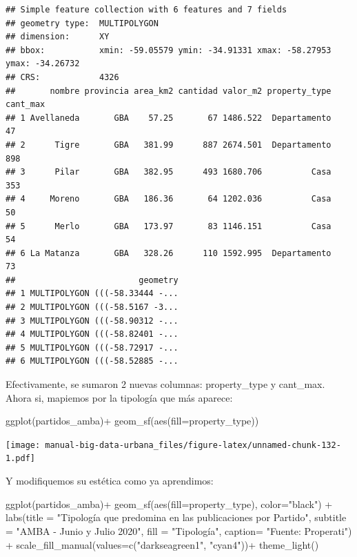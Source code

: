 \documentclass[
  spanish,
]{book}
\newenvironment{Shaded}{\begin{snugshade}}{\end{snugshade}}
\newcommand{\AttributeTok}[1]{\textcolor[rgb]{0.77,0.63,0.00}{#1}}
\newcommand{\FunctionTok}[1]{\textcolor[rgb]{0.00,0.00,0.00}{#1}}
\newcommand{\NormalTok}[1]{#1}
\newcommand{\SpecialCharTok}[1]{\textcolor[rgb]{0.00,0.00,0.00}{#1}}
\newcommand{\StringTok}[1]{\textcolor[rgb]{0.31,0.60,0.02}{#1}}
\begin{document}
\begin{verbatim}
## Simple feature collection with 6 features and 7 fields
## geometry type:  MULTIPOLYGON
## dimension:      XY
## bbox:           xmin: -59.05579 ymin: -34.91331 xmax: -58.27953 ymax: -34.26732
## CRS:            4326
##       nombre provincia area_km2 cantidad valor_m2 property_type cant_max
## 1 Avellaneda       GBA    57.25       67 1486.522  Departamento       47
## 2      Tigre       GBA   381.99      887 2674.501  Departamento      898
## 3      Pilar       GBA   382.95      493 1680.706          Casa      353
## 4     Moreno       GBA   186.36       64 1202.036          Casa       50
## 5      Merlo       GBA   173.97       83 1146.151          Casa       54
## 6 La Matanza       GBA   328.26      110 1592.995  Departamento       73
##                         geometry
## 1 MULTIPOLYGON (((-58.33444 -...
## 2 MULTIPOLYGON (((-58.5167 -3...
## 3 MULTIPOLYGON (((-58.90312 -...
## 4 MULTIPOLYGON (((-58.82401 -...
## 5 MULTIPOLYGON (((-58.72917 -...
## 6 MULTIPOLYGON (((-58.52885 -...
\end{verbatim}

Efectivamente, se sumaron 2 nuevas columnas: property\_type y cant\_max. Ahora si, mapiemos por la tipología que más aparece:

\begin{Shaded}
\begin{Highlighting}[]
\FunctionTok{ggplot}\NormalTok{(partidos\_amba)}\SpecialCharTok{+}
  \FunctionTok{geom\_sf}\NormalTok{(}\FunctionTok{aes}\NormalTok{(}\AttributeTok{fill=}\NormalTok{property\_type))}
\end{Highlighting}
\end{Shaded}

\texttt{[image: manual-big-data-urbana\_files/figure-latex/unnamed-chunk-132-1.pdf]}

Y modifiquemos su estética como ya aprendimos:

\begin{Shaded}
\begin{Highlighting}[]
\FunctionTok{ggplot}\NormalTok{(partidos\_amba)}\SpecialCharTok{+}
  \FunctionTok{geom\_sf}\NormalTok{(}\FunctionTok{aes}\NormalTok{(}\AttributeTok{fill=}\NormalTok{property\_type), }\AttributeTok{color=}\StringTok{"black"}\NormalTok{) }\SpecialCharTok{+}
    \FunctionTok{labs}\NormalTok{(}\AttributeTok{title =} \StringTok{"Tipología que predomina en las publicaciones por Partido"}\NormalTok{,}
         \AttributeTok{subtitle =} \StringTok{"AMBA {-} Junio y Julio 2020"}\NormalTok{,}
         \AttributeTok{fill =} \StringTok{"Tipología"}\NormalTok{,}
         \AttributeTok{caption=} \StringTok{"Fuente: Properati"}\NormalTok{) }\SpecialCharTok{+}
  \FunctionTok{scale\_fill\_manual}\NormalTok{(}\AttributeTok{values=}\FunctionTok{c}\NormalTok{(}\StringTok{"darkseagreen1"}\NormalTok{, }\StringTok{"cyan4"}\NormalTok{))}\SpecialCharTok{+}
  \FunctionTok{theme\_light}\NormalTok{()}
\end{Highlighting}
\end{Shaded}
\end{document}
